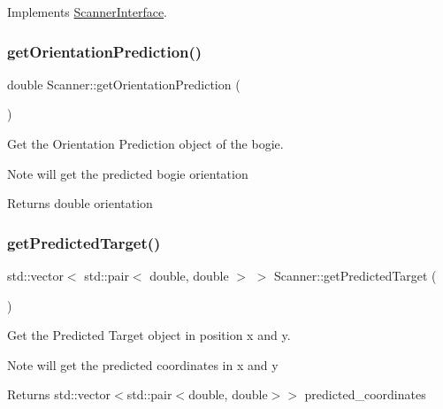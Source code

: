 Implements \hyperlink{classScannerInterface_a7f6b7a9cd907c8fdde13784ae3caec00}{Scanner\+Interface}.

\mbox{\label{classScanner_a3ba854fbf61ce01180479f2d9fbf11f9}} 
\subsubsection{\texorpdfstring{get\+Orientation\+Prediction()}{getOrientationPrediction()}}
{\footnotesize\ttfamily double Scanner\+::get\+Orientation\+Prediction (\begin{DoxyParamCaption}{ }\end{DoxyParamCaption})}



Get the Orientation Prediction object of the bogie. 

\begin{DoxyNote}{Note}
will get the predicted bogie orientation 
\end{DoxyNote}
\begin{DoxyReturn}{Returns}
double orientation 
\end{DoxyReturn}
\mbox{\label{classScanner_a4f9ba72b2339cad7e3cb7ffe46196ea2}} 
\subsubsection{\texorpdfstring{get\+Predicted\+Target()}{getPredictedTarget()}}
{\footnotesize\ttfamily std\+::vector$<$ std\+::pair$<$ double, double $>$ $>$ Scanner\+::get\+Predicted\+Target (\begin{DoxyParamCaption}{ }\end{DoxyParamCaption})\hspace{0.3cm}{\ttfamily [virtual]}}



Get the Predicted Target object in position x and y. 

\begin{DoxyNote}{Note}
will get the predicted coordinates in x and y 
\end{DoxyNote}
\begin{DoxyReturn}{Returns}
std\+::vector$<$std\+::pair$<$double, double$>$$>$ predicted\+\_\+coordinates 
\end{DoxyReturn}


